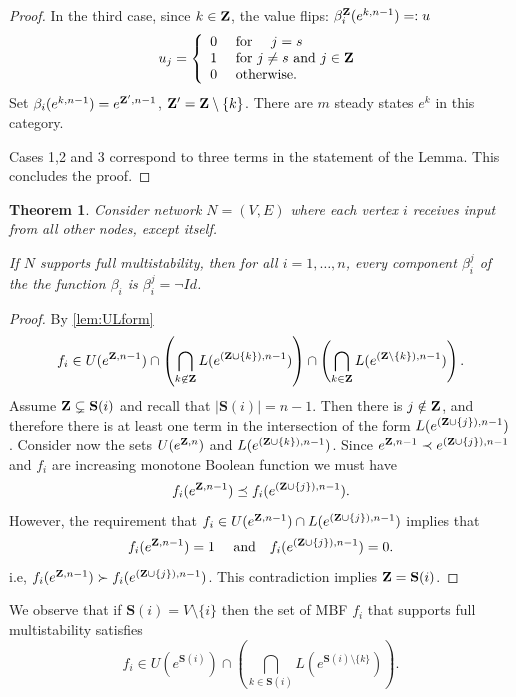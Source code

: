 \documentclass[12pt]{amsart}
\newcommand{\bZ}{{\bf Z}}
\newcommand{\Sources}{\mathbf{S}}
\newtheorem{thm}{Theorem}[section]
\theoremstyle{definition}
\begin{document}
\begin{proof}
In the third case, since $k\in \bZ$, the value flips: $\beta_{i}^{\bZ}(e^{k,n-1}) =: u$
\[
u_j=\left \{ \begin{array}{cl}
0 & \mbox{ for }\quad j = s \\
1 & \mbox{ for } j \not = s \text{ and } j \in \bZ \\
0 & \mbox{ otherwise.}
\end{array}
\right.
\]
Set  $\beta_{i}(e^{k,n-1}) = e^{{\bZ^\prime,n-1}}$, $\bZ^\prime = \bZ \setminus \{k\} $.
There are $m$ steady states $e^k$ in this category.

Cases 1,2 and 3 correspond to three terms in the statement of the Lemma. This concludes the proof.
\end{proof}
 

\begin{thm} \label{thm:all_inputs}
     Consider network $N=(V,E)$ where each vertex $i$ receives input from all other nodes, except itself.
     
     If $N$ supports full multistability, then for all $i=1, \ldots, n$, every component $\beta^j_{i}$ of the the function $\beta_i$ is $\beta^j_{i} =\neg Id$. 
\end{thm}

\begin{proof}
By \cref{lem:ULform}
\[ f_i \in U(e^{\bZ,n-1})\cap \left( \bigcap_{k \not \in \bZ} L(e^{(\bZ\cup \{k\}),n-1}) \right)\cap \left(\bigcap_{k\in \bZ} L(e^{(\bZ\setminus \{k\}),n-1})\right).\]
Assume $\bZ\subsetneq \Sources(i)$ and recall that $|\Sources(i)|=n-1$. Then there is $j \notin \bZ$, and therefore there is at least one term in the intersection of the form $L(e^{(\bZ\cup \{j\}),n-1})$.
Consider now the sets $U(e^{\bZ,n})$ and $L(e^{(\bZ\cup \{k\}),n-1})$. 
Since $e^{\bZ,n-1} \prec e^{(\bZ\cup \{j\}),n-1}$ and $f_i$ are increasing monotone Boolean function we must have 
\[ f_i(e^{\bZ,n-1}) \preceq f_i(e^{(\bZ\cup \{j\}),n-1}).\]
However, the requirement that $f_i\in U(e^{\bZ,n-1}) \cap L(e^{(\bZ\cup \{j\}),n-1})$ implies that 
\[ f_i(e^{\bZ,n-1})=1 \quad \mbox{ and} \quad f_i(e^{(\bZ\cup \{j\}),n-1})=0.\]
i.e, $f_i(e^{\bZ,n-1}) \succ f_i(e^{(\bZ\cup \{j\}),n-1})$. This contradiction implies $\bZ =\Sources(i)$.
\end{proof}

We observe that if $\Sources(i) = V \setminus \{i\}$ then the set of MBF $f_i$ that supports full multistability satisfies 
\begin{equation}\label{eq:multistability}
f_i \in U(e^{\Sources(i)}) \cap \left(\bigcap_{k\in \Sources(i)} L(e^{\Sources(i)\setminus \{k\}}) \right ).
\end{equation}
\end{document}
